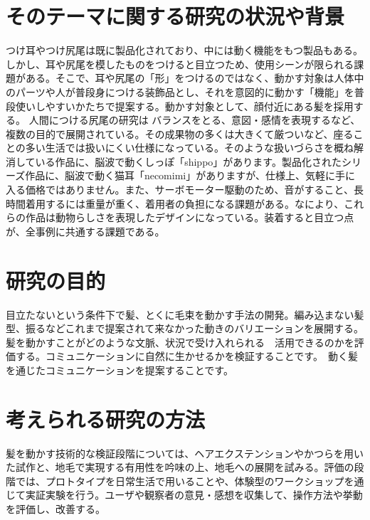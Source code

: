\documentclass[a4paper]{jsarticle}
\begin{document}
\section{そのテーマに関する研究の状況や背景}
つけ耳やつけ尻尾は既に製品化されており、中には動く機能をもつ製品もある。しかし、耳や尻尾を模したものをつけると目立つため、使用シーンが限られる課題がある。そこで、耳や尻尾の「形」をつけるのではなく、動かす対象は人体中のパーツや人が普段身につける装飾品とし、それを意図的に動かす「機能」を普段使いしやすいかたちで提案する。動かす対象として、顔付近にある髪を採用する。
人間につける尻尾の研究は
バランスをとる\cite{Augmenting Human With a Tail}、意図・感情を表現する\cite{Augmenting Human With a Tail}など、複数の目的で展開されている。その成果物の多くは大きくて厳ついなど、座ることの多い生活では扱いにくい仕様になっている。そのような扱いづらさを概ね解消している作品に、脳波で動くしっぽ「shippo」\cite{necomimi}があります。製品化されたシリーズ作品に、脳波で動く猫耳「necomimi」\cite{necomimi}がありますが、仕様上、気軽に手に入る価格ではありません。また、サーボモーター駆動のため、音がすること、長時間着用するには重量が重く、着用者の負担になる課題がある。なにより、これらの作品は動物らしさを表現したデザインになっている。装着すると目立つ点が、全事例に共通する課題である。%

\section{研究の目的} 
目立たないという条件下で髪、とくに毛束を動かす手法の開発。編み込まない髪型、振るなどこれまで提案されて来なかった動きのバリエーションを展開する。髪を動かすことがどのような文脈、状況で受け入れられる　活用できるのかを評価する。コミュニケーションに自然に生かせるかを検証することです。　動く髪を通じたコミュニケーションを提案することです。

\section{考えられる研究の方法} 
髪を動かす技術的な検証段階については、ヘアエクステンションやかつらを用いた試作と、地毛で実現する有用性を吟味の上、地毛への展開を試みる。評価の段階では、プロトタイプを日常生活で用いることや、体験型のワークショップを通じて実証実験を行う。ユーザや観察者の意見・感想を収集して、操作方法や挙動を評価し、改善する。
\end{document}
